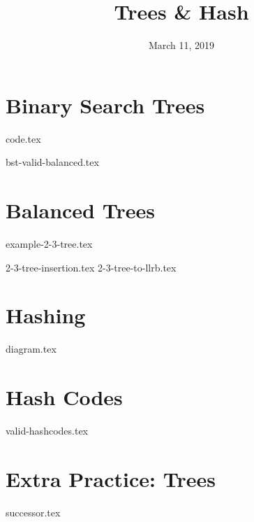 \documentclass[11pt]{exam}
\title{Trees \& Hash}
\date{March 11, 2019}
\begin{document}
\maketitle
\section{Binary Search Trees}
{code.tex}
\begin{questions}
{bst-valid-balanced.tex}
\clearpage

\end{questions}

\clearpage

\section{Balanced Trees}
{example-2-3-tree.tex}
\begin{questions}
{2-3-tree-insertion.tex}
{2-3-tree-to-llrb.tex}
\end{questions}

\clearpage

\section{Hashing}
\begin{questions}
{diagram.tex}
\end{questions}

\clearpage

\section{Hash Codes}
\begin{questions}
{valid-hashcodes.tex}
\end{questions}

\clearpage

\section{Extra Practice: Trees}
\begin{questions}
{successor.tex}
\end{questions}
\end{document}
